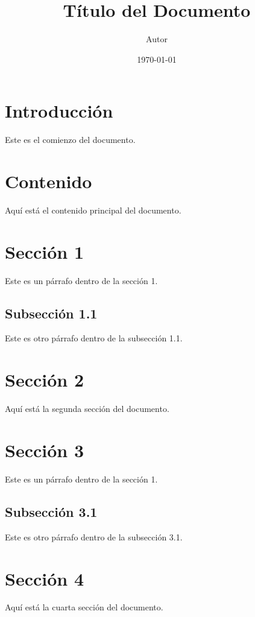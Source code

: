 \documentclass{article}
\begin{document}
	\title{Título del Documento}
	\author{Autor}
	\date{\today}
	\maketitle
	
	\section{Introducción}
	Este es el comienzo del documento.
	
	\section{Contenido}
	Aquí está el contenido principal del documento.
	
	\section{Sección 1}
	Este es un párrafo dentro de la sección 1.
	
	\subsection{Subsección 1.1}
	Este es otro párrafo dentro de la subsección 1.1.
	
	\section{Sección 2}
	Aquí está la segunda sección del documento.

	\section{Sección 3}
	Este es un párrafo dentro de la sección 1.
	
	\subsection{Subsección 3.1}
	Este es otro párrafo dentro de la subsección 3.1.
	
	\section{Sección 4}
	Aquí está la cuarta sección del documento.
\end{document}
